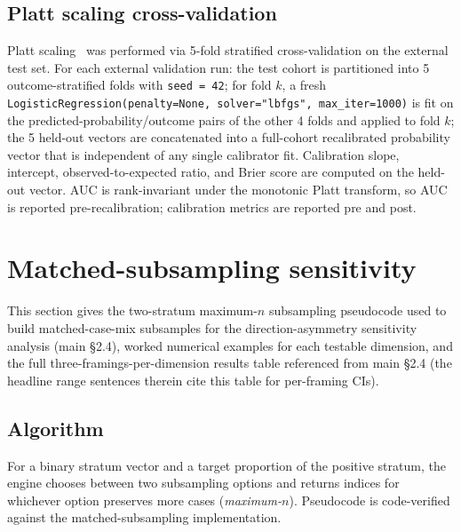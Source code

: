 \documentclass[11pt,a4paper]{article}
\begin{document}
\subsection{Platt scaling cross-validation}\label{supp:s3-platt}

Platt scaling~\cite{Platt1999} was performed via 5-fold stratified
cross-validation on the external test set. For each
external validation run: the test cohort is partitioned into 5
outcome-stratified folds with \texttt{seed = 42}; for fold $k$, a fresh
\texttt{LogisticRegression(penalty=None, solver="lbfgs", max\_iter=1000)} is
fit on the predicted-probability/outcome pairs of the other 4 folds and
applied to fold $k$; the 5 held-out vectors are concatenated into a
full-cohort recalibrated probability vector that is independent of any
single calibrator fit. Calibration slope, intercept, observed-to-expected
ratio, and Brier score are computed on the held-out vector. AUC is
rank-invariant under the
monotonic Platt transform, so AUC is reported pre-recalibration; calibration
metrics are reported pre and post.


\section{Matched-subsampling sensitivity}\label{supp:s4-matched}

This section gives the two-stratum maximum-$n$ subsampling pseudocode used
to build matched-case-mix subsamples for the direction-asymmetry sensitivity
analysis (main \S2.4), worked numerical examples for each testable dimension,
and the full three-framings-per-dimension results table referenced from main
\S2.4 (the headline range sentences therein cite this table for per-framing
CIs).

\subsection{Algorithm}\label{supp:s4-algorithm}

For a binary stratum vector and a target proportion of the positive stratum,
the engine chooses between two subsampling options and returns indices for
whichever option preserves more cases (\emph{maximum-$n$}). Pseudocode is
code-verified against the matched-subsampling implementation.
\end{document}
